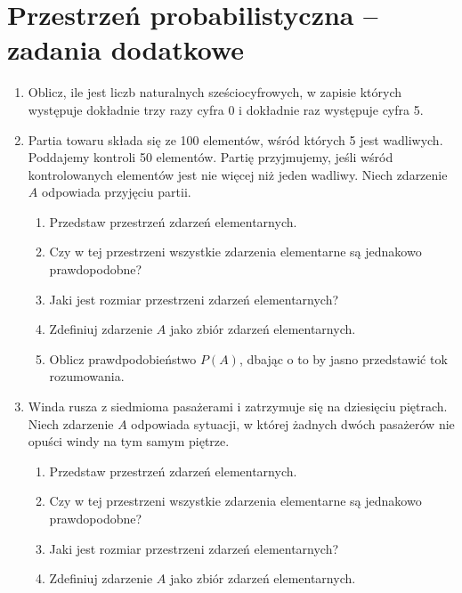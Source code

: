 \documentclass{mwart}
\newcommand{\ans}[1]{}
\begin{document}
\section{Przestrzeń probabilistyczna -- zadania dodatkowe}
\begin{enumerate}
\item Oblicz, ile jest liczb naturalnych sześciocyfrowych, w zapisie których występuje dokładnie trzy razy cyfra 0 i dokładnie raz występuje cyfra 5. \ans{${8\choose 2}3\frac{5!}{3!}+8\cdot\left(\frac{5!}{3!2!}+\frac{5!}{3!}\right)=1920$}
\item Partia towaru składa się ze 100 elementów, wśród których 5 jest wadliwych. Poddajemy kontroli 50 elementów. Partię przyjmujemy, jeśli wśród kontrolowanych elementów jest nie więcej niż jeden wadliwy. Niech zdarzenie $A$ odpowiada przyjęciu partii.
\begin{enumerate}%
\item Przedstaw przestrzeń zdarzeń elementarnych. \ans{$\Omega=\{\omega_J|\left|J\right|=50 \land J\subset\{1,2,\ldots,100\}\}$}%
\item Czy w tej przestrzeni wszystkie zdarzenia elementarne są jednakowo prawdopodobne? \ans{Tak}%
\item Jaki jest rozmiar przestrzeni zdarzeń elementarnych? \ans{$\left|\Omega\right|={100\choose 50}$}%
\item Zdefiniuj zdarzenie $A$ jako zbiór zdarzeń elementarnych. \ans{$A=\{\omega_J|\left|J\cap \{1,2,\ldots,5\}\right|\leq 1\}$}%
\item Oblicz prawdpodobieństwo $P(A)$, dbając o to by jasno przedstawić tok rozumowania. \ans{$\left|A\right|={5\choose 1}{95\choose 49}+{95\choose 50}, P(A)\approx0{,}181$}%
\end{enumerate}%
\item Winda rusza z siedmioma pasażerami i zatrzymuje się na dziesięciu piętrach. Niech zdarzenie $A$ odpowiada sytuacji, w której żadnych dwóch pasażerów nie opuści windy na tym samym piętrze.
\begin{enumerate}%
\item Przedstaw przestrzeń zdarzeń elementarnych. \ans{$\Omega=\{\omega_{i_1,\ldots,i_7}|i_j=1,2,\ldots,10\}$}%
\item Czy w tej przestrzeni wszystkie zdarzenia elementarne są jednakowo prawdopodobne? \ans{Tak}%
\item Jaki jest rozmiar przestrzeni zdarzeń elementarnych? \ans{$\left|\Omega\right|=10^7$}%
\item Zdefiniuj zdarzenie $A$ jako zbiór zdarzeń elementarnych. \ans{$A=\{\omega_{i_1,\ldots,i_7}|\forall j,k\colon j\neq k\to i_j\neq i_k\}, \left|A\right|=\frac{10!}{3!}=604800$}%

\end{enumerate}
\end{enumerate}
\end{document}
